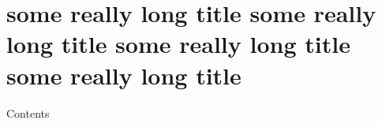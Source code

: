 \documentclass{beamer}
\begin{document}
    \section{some really long title some really long title some really long title
        some really long title}

    \begin{frame}{Contents}
        \tableofcontents[currentsection,hideallsubsections,subsubsectionstyle=hide]
    \end{frame}
\end{document}
